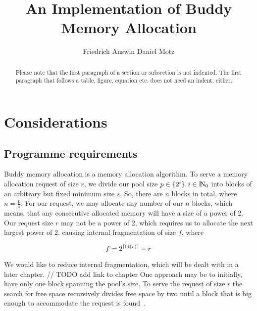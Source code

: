 \documentclass[runningheads]{llncs}
\DeclarePairedDelimiter\ceil{\lceil}{\rceil}
\begin{document}
%
\title{An Implementation of Buddy Memory Allocation}
%
%
\author{Friedrich Answin Daniel Motz}
%
%
%
\maketitle              %
%
\begin{abstract}
Please note that the first paragraph of a section or subsection is
not indented. The first paragraph that follows a table, figure,
equation etc. does not need an indent, either.

\end{abstract}
%
%
%
\section{Considerations}
\subsection{Programme requirements}
Buddy memory allocation is a memory allocation algorithm. To serve a memory
allocation request of size $r$, we divide our pool size 
$p \in \{2^i\}, i \in {\rm I\!N}_0$ into blocks of 
an arbitrary but fixed minimum size $s$. So, there are $n$ blocks in total,
where $n = \frac{p}{s}$.
For our request, we may allocate any number of our $n$ blocks, which means,
that any consecutive allocated memory will have a size of a power of 2.
Our request size $r$ may not be a power of 2, which requires us to allocate 
the next largest power of 2, causing internal fragmentation of size $f$, where

\[ f = 2^{\ceil{\text{ld}(r)}} - r \]

We would like to reduce internal fragmentation, which will be dealt with in a 
later chapter. // TODO add link to chapter
One approach may be to initially, have only one block spanning the pool's size.
To serve the request of size $r$ the search for free space recursively divides
free space by two until a block that is big enough to accommodate the request 
is found~\cite{ostep}.
\end{document}
